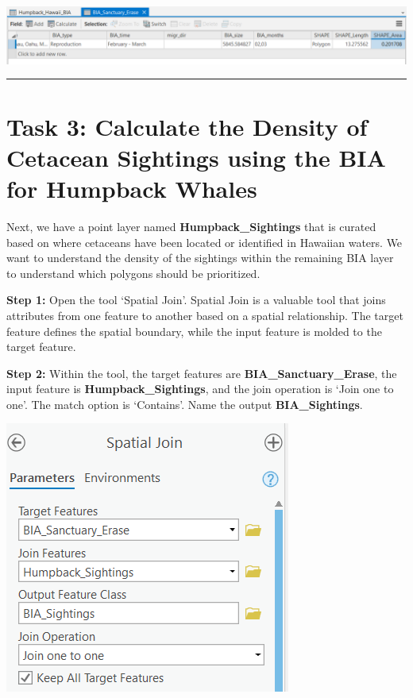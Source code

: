 \documentclass[
]{book}
\begin{document}
\includegraphics[width=0.75\linewidth]{images/05-bia-sanctuary-erase-attribute-table}

\begin{center}\rule{0.5\linewidth}{0.5pt}\end{center}

\hypertarget{task-3-calculate-the-density-of-cetacean-sightings-using-the-bia-for-humpback-whales}{%
\section*{Task 3: Calculate the Density of Cetacean Sightings using the BIA for Humpback Whales}\label{task-3-calculate-the-density-of-cetacean-sightings-using-the-bia-for-humpback-whales}}

Next, we have a point layer named \textbf{Humpback\_Sightings} that is curated based on where cetaceans have been located or identified in Hawaiian waters. We want to understand the density of the sightings within the remaining BIA layer to understand which polygons should be prioritized.

\textbf{Step 1:} Open the tool `Spatial Join'. Spatial Join is a valuable tool that joins attributes from one feature to another based on a spatial relationship. The target feature defines the spatial boundary, while the input feature is molded to the target feature.

\textbf{Step 2:} Within the tool, the target features are \textbf{BIA\_Sanctuary\_Erase}, the input feature is \textbf{Humpback\_Sightings}, and the join operation is `Join one to one'. The match option is `Contains'. Name the output \textbf{BIA\_Sightings}.

\includegraphics[width=0.5\linewidth]{images/05-spatial-join}
\end{document}
